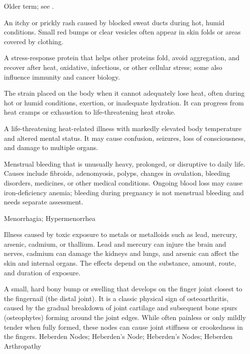 Older term; see .

 An itchy or prickly rash caused by blocked sweat ducts during hot, humid conditions. Small red bumps or clear vesicles often appear in skin folds or areas covered by clothing.

 A stress-response protein that helps other proteins fold, avoid aggregation, and recover after heat, oxidative, infectious, or other cellular stress; some also influence immunity and cancer biology.

 The strain placed on the body when it cannot adequately lose heat, often during hot or humid conditions, exertion, or inadequate hydration. It can progress from heat cramps or exhaustion to life-threatening heat stroke.

 A life-threatening heat-related illness with markedly elevated body temperature and altered mental status. It may cause confusion, seizures, loss of consciousness, and damage to multiple organs.

 Menstrual bleeding that is unusually heavy, prolonged, or disruptive to daily life. Causes include fibroids, adenomyosis, polyps, changes in ovulation, bleeding disorders, medicines, or other medical conditions. Ongoing blood loss may cause iron-deficiency anemia; bleeding during pregnancy is not menstrual bleeding and needs separate assessment.

\synonyms
Menorrhagia; Hypermenorrhea

 Illness caused by toxic exposure to metals or metalloids such as lead, mercury, arsenic, cadmium, or thallium. Lead and mercury can injure the brain and nerves, cadmium can damage the kidneys and lungs, and arsenic can affect the skin and internal organs. The effects depend on the substance, amount, route, and duration of exposure.

 A small, hard bony bump or swelling that develops on the finger joint closest to the fingernail (the distal joint). It is a classic physical sign of osteoarthritis, caused by the gradual breakdown of joint cartilage and subsequent bone spurs (osteophytes) forming around the joint edges. While often painless or only mildly tender when fully formed, these nodes can cause joint stiffness or crookedness in the fingers.
\synonyms
Heberden Nodes; Heberden's Node; Heberden's Nodes; Heberden Arthropathy

